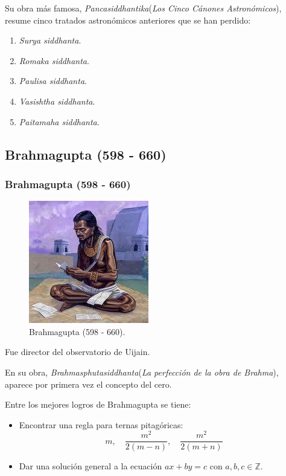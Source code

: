 \documentclass[12pt, aspectratio=169]{beamer} %
\begin{document}
		\begin{frame}
			Su obra más famosa, \textit{Pancasiddhantika}(\textit{Los Cinco Cánones Astronómicos}), resume cinco tratados
			astronómicos anteriores que se han perdido:
			\begin{enumerate}
				\item \textit{Surya siddhanta}.
				\item \textit{Romaka siddhanta}.
				\item \textit{Paulisa siddhanta}.
				\item \textit{Vasishtha siddhanta}.
				\item \textit{Paitamaha siddhanta}.
			\end{enumerate}
		\end{frame}
		
	\subsection{Brahmagupta (598 - 660)}
		\begin{frame}
			\frametitle{Brahmagupta (598 - 660)}
			\begin{figure}
				\centering
				\includegraphics[width = .3\linewidth]{brahmagupta.jpg}
				\caption{Brahmagupta (598 - 660).}
			\end{figure}
		\end{frame}

		\begin{frame}
			Fue director del observatorio de Uijain.

			En su obra, \textit{Brahmasphutasiddhanta}(\textit{La perfección de la obra de Brahma}), aparece por
			primera vez el concepto del cero.
	
			Entre los mejores logros de Brahmagupta se tiene:
			\begin{itemize}
				\item Encontrar una regla para ternas pitagóricas:
				$$ m, \quad {\frac{m^{2}}{2(m-n)}}, \quad {\frac{m^{2}}{2(m+n)}}$$
				\item Dar una solución general a la ecuación $ax + by = c$ con $a,b,c \in \mathbb {Z}$.
			\end{itemize}
		\end{frame}
\end{document}
